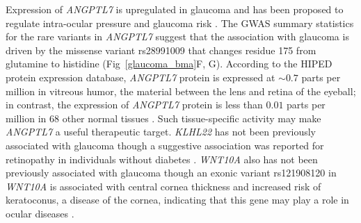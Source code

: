 Expression of \textit{ANGPTL7} is upregulated in glaucoma and has been proposed to regulate intra-ocular pressure and glaucoma risk \cite{Comes:2011ex, Kuchtey:2008ek}. The GWAS summary statistics for the rare variants in \textit{ANGPTL7} suggest that the association with glaucoma is driven by the missense variant rs28991009 that changes residue 175 from glutamine to histidine (Fig~\ref{glaucoma_bma}F, G). According to the HIPED protein expression database, \textit{ANGPTL7} protein is expressed at $\sim0.7$ parts per million in vitreous humor, the material between the lens and retina of the eyeball; in contrast, the expression of \textit{ANGPTL7} protein is less than $0.01$ parts per million in 68 other normal tissues \cite{Fishilevich:2016hx}. Such tissue-specific activity may make \textit{ANGPTL7} a useful therapeutic target. \textit{KLHL22} has not been previously associated with glaucoma though a suggestive association was reported for retinopathy in individuals without diabetes \cite{10.1371/journal.pone.0054232}. \textit{WNT10A} also has not been previously associated with glaucoma though an exonic variant rs121908120 in \textit{WNT10A} is associated with central cornea thickness and increased risk of keratoconus, a disease of the cornea, indicating that this gene may play a role in ocular diseases \cite{CuellarPartida:2015hb}.


